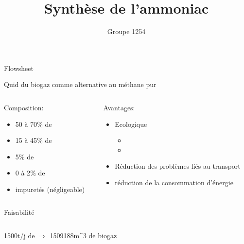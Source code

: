 \documentclass{beamer}
\begin{document}
\title{Synthèse de l'ammoniac}
\author{Groupe 1254}
\date{}
\maketitle
\begin{frame}{Flowsheet}

\begin{center}
\resizebox{6cm}{6cm}{
	}
\end{center}
\end{frame}

\begin{frame}{Quid du biogaz comme alternative au méthane pur}
	\begin{columns}
		\begin{column}{0.40\textwidth}
		Composition:
			\begin{itemize}
			\item 50 à \unit{70}{\%} de 
			\item 15 à \unit{45}{\%} de 
			\item  \unit{5}{\%} de 
			\item 0 à \unit{2}{\%} de 
			\item impuretés (négligeable)
			\end{itemize}
		\end{column}
		\begin{column}{0.40\textwidth}
		Avantages:
			\begin{itemize}
			\item Ecologique 
				\begin{itemize}
				\item {}
				\item {}
				\end{itemize}
			\item Réduction des problèmes liés au transport
			\item réduction de la consommation d'énergie
			\end{itemize}
		\end{column}
	\end{columns}
\end{frame}
\begin{frame}{Faisabilité}
	\begin{columns}
		\begin{column}{0.40\textwidth}
		\unit{1500}{t/j} de  $\Longrightarrow$ \unit{1509188}{m^3} de biogaz
		\end{column}
		\begin{column}{0.40\textwidth}
		\end{column}
	\end{columns}
\end{frame}
\end{document}
